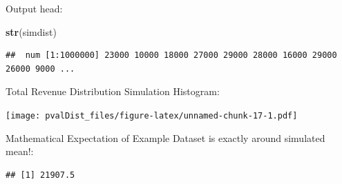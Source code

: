 \documentclass[]{article}
\newenvironment{Shaded}{\begin{snugshade}}{\end{snugshade}}
\newcommand{\DataTypeTok}[1]{\textcolor[rgb]{0.13,0.29,0.53}{#1}}
\newcommand{\DecValTok}[1]{\textcolor[rgb]{0.00,0.00,0.81}{#1}}
\newcommand{\KeywordTok}[1]{\textcolor[rgb]{0.13,0.29,0.53}{\textbf{#1}}}
\newcommand{\NormalTok}[1]{#1}
\newcommand{\OperatorTok}[1]{\textcolor[rgb]{0.81,0.36,0.00}{\textbf{#1}}}
\newcommand{\StringTok}[1]{\textcolor[rgb]{0.31,0.60,0.02}{#1}}
\begin{document}
\begin{Shaded}
\end{Shaded}

Output head:

\begin{Shaded}
\begin{Highlighting}[]
\KeywordTok{str}\NormalTok{(simdist)}
\end{Highlighting}
\end{Shaded}

\begin{verbatim}
##  num [1:1000000] 23000 10000 18000 27000 29000 28000 16000 29000 26000 9000 ...
\end{verbatim}

Total Revenue Distribution Simulation Histogram:

\texttt{[image: pvalDist\_files/figure-latex/unnamed-chunk-17-1.pdf]}

Mathematical Expectation of Example Dataset is exactly around simulated
mean!:

\begin{Shaded}
\end{Shaded}

\begin{verbatim}
## [1] 21907.5
\end{verbatim}
\end{document}
